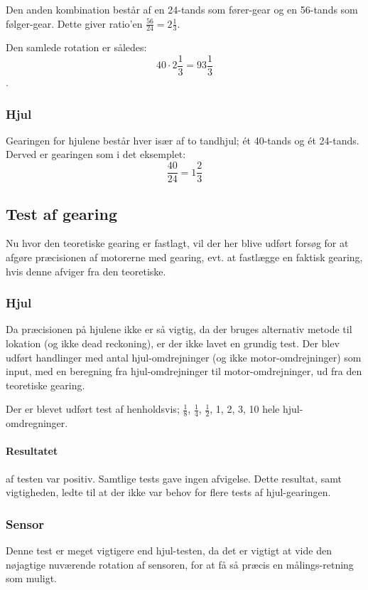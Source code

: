Den anden kombination består af en 24-tands som fører-gear og en 56-tands som følger-gear.
Dette giver ratio'en $\frac{56}{24} = 2 \frac{1}{3}$.

Den samlede rotation er således: $$40 \cdot 2\frac{1}{3} = 93 \frac{1}{3}$$.

\subsubsection{Hjul}
Gearingen for hjulene består hver især af to tandhjul; ét 40-tands og ét 24-tands.
Derved er gearingen som i det eksemplet: $$ \frac{40}{24} = 1 \frac{2}{3} $$

\subsection{Test af gearing}
Nu hvor den teoretiske gearing er fastlagt, vil der her blive udført forsøg for at afgøre præcisionen af motorerne med gearing, evt. at fastlægge en faktisk gearing, hvis denne afviger fra den teoretiske.

\subsubsection{Hjul}
Da præcisionen på hjulene ikke er så vigtig, da der bruges alternativ metode til lokation (og ikke dead reckoning), er der ikke lavet en grundig test.
Der blev udført handlinger med antal hjul-omdrejninger (og ikke motor-omdrejninger) som input, med en beregning fra hjul-omdrejninger til motor-omdrejninger, ud fra den teoretiske gearing.

Der er blevet udført test af henholdsvis; $\frac{1}{8}$, $\frac{1}{4}$, $\frac{1}{2}$, 1, 2, 3, 10 hele hjul-omdregninger.

\paragraph{Resultatet} af testen var positiv.
Samtlige tests gave ingen afvigelse.
Dette resultat, samt vigtigheden, ledte til at der ikke var behov for flere tests af hjul-gearingen.

\subsubsection{Sensor}
Denne test er meget vigtigere end hjul-testen, da det er vigtigt at vide den nøjagtige nuværende rotation af sensoren, for at få så præcis en målings-retning som muligt.

